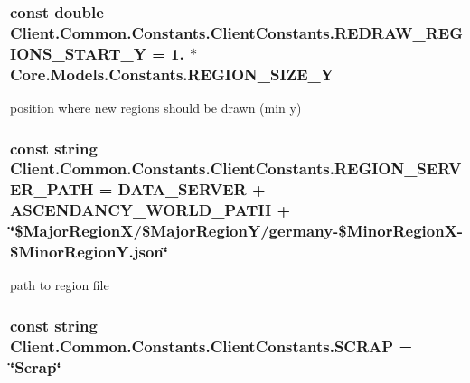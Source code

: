 \subsubsection[{R\+E\+D\+R\+A\+W\+\_\+\+R\+E\+G\+I\+O\+N\+S\+\_\+\+S\+T\+A\+R\+T\+\_\+\+Y}]{\setlength{\rightskip}{0pt plus 5cm}const double Client.\+Common.\+Constants.\+Client\+Constants.\+R\+E\+D\+R\+A\+W\+\_\+\+R\+E\+G\+I\+O\+N\+S\+\_\+\+S\+T\+A\+R\+T\+\_\+\+Y = 1. $\ast$ {\bf Core.\+Models.\+Constants.\+R\+E\+G\+I\+O\+N\+\_\+\+S\+I\+Z\+E\+\_\+\+Y}}\label{classClient_1_1Common_1_1Constants_1_1ClientConstants_a481e9d8491a7f31ad27b060d8738a42b}


position where new regions should be drawn (min y) 

\hypertarget{classClient_1_1Common_1_1Constants_1_1ClientConstants_a7fa21e9a22967348de75863f83d8324e}{}
\subsubsection[{R\+E\+G\+I\+O\+N\+\_\+\+S\+E\+R\+V\+E\+R\+\_\+\+P\+A\+T\+H}]{\setlength{\rightskip}{0pt plus 5cm}const string Client.\+Common.\+Constants.\+Client\+Constants.\+R\+E\+G\+I\+O\+N\+\_\+\+S\+E\+R\+V\+E\+R\+\_\+\+P\+A\+T\+H = {\bf D\+A\+T\+A\+\_\+\+S\+E\+R\+V\+E\+R} + {\bf A\+S\+C\+E\+N\+D\+A\+N\+C\+Y\+\_\+\+W\+O\+R\+L\+D\+\_\+\+P\+A\+T\+H} + \char`\"{}\$Major\+Region\+X/\$Major\+Region\+Y/germany-\/\$Minor\+Region\+X-\/\$Minor\+Region\+Y.\+json\char`\"{}}\label{classClient_1_1Common_1_1Constants_1_1ClientConstants_a7fa21e9a22967348de75863f83d8324e}


path to region file 

\hypertarget{classClient_1_1Common_1_1Constants_1_1ClientConstants_a4dbf6aab0cfaf32bde33786ce254a15c}{}
\subsubsection[{S\+C\+R\+A\+P}]{\setlength{\rightskip}{0pt plus 5cm}const string Client.\+Common.\+Constants.\+Client\+Constants.\+S\+C\+R\+A\+P = \char`\"{}Scrap\char`\"{}}\label{classClient_1_1Common_1_1Constants_1_1ClientConstants_a4dbf6aab0cfaf32bde33786ce254a15c}



